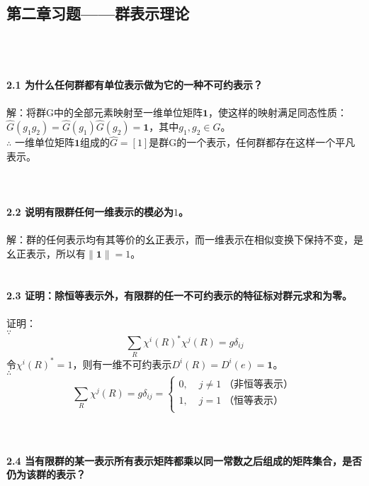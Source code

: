 \documentclass[12pt]{article}
\numberwithin{equation}{section}	 %
\begin{document}
\begin{spacing}{1.5}
\section{第二章习题——群表示理论}
~\\
~\\
~\\
\textbf{2.1 \quad 为什么任何群都有单位表示做为它的一种不可约表示？}\\
~\\
解：将群G中的全部元素映射至一维单位矩阵$\bm1$，使这样的映射满足同态性质：$\hat{G}(g_{1}g_{2}) = \hat{G}(g_{1})\hat{G}(g_{2}) = \bm1$，其中$g_{1},g_{2} \in G$。\\
$\therefore$ 一维单位矩阵$\bm1$组成的$\hat{G} = [1]$是群G的一个表示，任何群都存在这样一个平凡表示。\\
~\\
~\\
~\\
\textbf{2.2 \quad 说明有限群任何一维表示的模必为$1$。}\\
~\\
解：群的任何表示均有其等价的幺正表示，而一维表示在相似变换下保持不变，是幺正表示，所以有$\|\bm{1}\|=1$。
~\\
~\\
~\\
\textbf{2.3 \quad 证明：除恒等表示外，有限群的任一不可约表示的特征标对群元求和为零。}\\
~\\
证明：\\
$\because$
\begin{equation}
\sum_{R} \chi^{i}(R)^{*}\chi^{j}(R) = g\delta_{ij}
\end{equation}
令$\chi^{i}(R)^{*} = 1$，则有一维不可约表示$D^{i}(R) = D^{i}(e) = \bm1$。\\
$\therefore$
\begin{equation}
\sum_{R} \chi^{j}(R) = g\delta_{ij} = \left\{		%
\begin{aligned}
0 , \; & j \ne 1 \; \text{（非恒等表示）} \\
1 , \; & j=1 \; \text{（恒等表示）}\\
\end{aligned}
\right.	%
\end{equation}
~\\
~\\
~\\
\textbf{2.4 \quad 当有限群的某一表示所有表示矩阵都乘以同一常数之后组成的矩阵集合，是否仍为该群的表示？}\\

\end{spacing}
\end{document}
